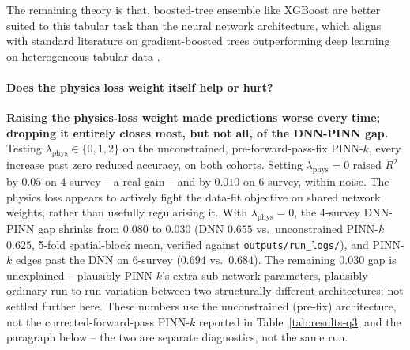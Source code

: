 \documentclass[logo,msc,ai]{infthesis}           %
\begin{document}
The remaining theory is that, boosted-tree ensemble like XGBoost are better suited to this tabular task than the neural network architecture, which aligns with standard literature on gradient-boosted trees outperforming deep learning on heterogeneous tabular data \cite{shwartzziv2021Tabular_C4_NN}.


\paragraph*{Does the physics loss weight itself help or hurt?}
\textbf{Raising the physics-loss weight made predictions worse every time; dropping it entirely closes most, but not all, of the DNN-PINN gap.} Testing $\lambda_{\mathrm{phys}} \in \{0,1,2\}$ on the unconstrained, pre-forward-pass-fix PINN-$k$, every increase past zero reduced accuracy, on both cohorts. Setting $\lambda_{\mathrm{phys}}=0$ raised $R^2$ by $0.05$ on 4-survey -- a real gain -- and by $0.010$ on 6-survey, within noise. The physics loss appears to actively fight the data-fit objective on shared network weights, rather than usefully regularising it. With $\lambda_{\mathrm{phys}}=0$, the 4-survey DNN-PINN gap shrinks from $0.080$ to $0.030$ (DNN $0.655$ vs.\ unconstrained PINN-$k$ $0.625$, 5-fold spatial-block mean, verified against \texttt{outputs/run\_logs/}), and PINN-$k$ edges past the DNN on 6-survey ($0.694$ vs.\ $0.684$). The remaining $0.030$ gap is unexplained -- plausibly PINN-$k$'s extra sub-network parameters, plausibly ordinary run-to-run variation between two structurally different architectures; not settled further here. These numbers use the unconstrained (pre-fix) architecture, not the corrected-forward-pass PINN-$k$ reported in Table~\ref{tab:results-q3} and the paragraph below -- the two are separate diagnostics, not the same run.
\end{document}
